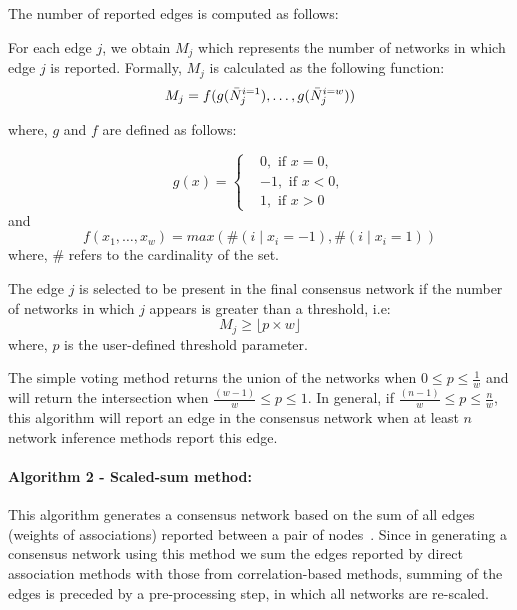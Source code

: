 \documentclass[letterpaper,12pt]{article}
\begin{document}
 The number of reported edges is computed as follows:

 For each edge $j$, we obtain $M_j$ which represents the number of networks in which edge $j$ is reported.
 Formally, $M_j$ is calculated as the following function:
  \begin{equation}
      M_j = f(g(\bar{N}^{i=1}_j), \dots, g(\bar{N}^{i=w}_j)) \\
    \label{eq:simple-voting}
  \end{equation}

where, $g$ and $f$ are defined as follows:

  \begin{equation*}
    g(x) =
    \begin{cases}
       & 0, \text{ if } x=0, \\
       & -1, \text{ if } x<0, \\
       & 1, \text{ if } x>0
    \end{cases}
  \end{equation*}
  and
  \begin{equation*}
    f(x_1,\dots,x_w) = max \left( \#(i \mid x_i=-1),\#(i \mid x_i=1)
       \right)
  \end{equation*}
  where, $\#$ refers to the cardinality of the set.

 The edge $j$ is selected to be present in the final consensus network if the number of networks in which $j$ appears is greater than a threshold, i.e:
  \begin{equation}
     M_j \geq \lfloor p \times w \rfloor
    \label{eqn:simple-voting2}
  \end{equation}
  where, $p$ is the user-defined threshold parameter.

  The simple voting method returns the union of the networks when $0 \leq p \leq \frac{1}{w}$ and will return the intersection when $\frac{(w - 1)}{w} \leq p \leq 1$.
  In general, if $\frac{(n - 1)}{w} \leq p \leq \frac{n}{w}$, this algorithm will report an edge in the consensus network when at least $n$ network inference methods report this edge.


  \paragraph*{Algorithm 2 - Scaled-sum method:}

  This algorithm generates a consensus network based on the sum of all edges (weights of associations) reported between a pair of nodes~\cite{bustinceFuzzySetsTheir2008,tsarevApplicationMajorityVoting2018}.
  Since in generating a consensus network using this method we sum the edges reported by direct association methods with those from correlation-based methods, summing of the edges is preceded by a pre-processing step, in which all networks are re-scaled.
\end{document}
